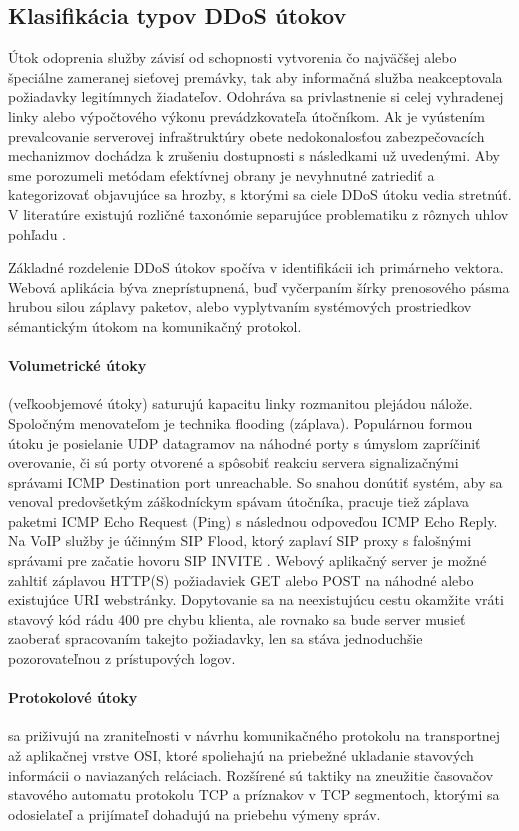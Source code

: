 \documentclass[12pt, a4paper]{article}
\begin{document}
\subsection{Klasifikácia typov DDoS útokov}
Útok odoprenia služby závisí od schopnosti vytvorenia čo najväčšej alebo špeciálne zameranej sieťovej 
premávky, tak aby informačná služba neakceptovala požiadavky legitímnych žiadateľov. Odohráva sa
privlastnenie si celej vyhradenej linky alebo výpočtového výkonu prevádzkovateľa útočníkom. 
Ak je vyústením prevalcovanie serverovej infraštruktúry obete nedokonalosťou zabezpečovacích 
mechanizmov dochádza k zrušeniu dostupnosti s následkami už uvedenými. Aby sme porozumeli metódam 
efektívnej obrany je nevyhnutné zatriediť a kategorizovať objavujúce sa
hrozby, s ktorými sa ciele DDoS útoku vedia stretnúť. V literatúre existujú rozličné taxonómie 
separujúce problematiku z rôznych uhlov pohľadu \cite{ddos-attacks} \cite{botnets} \cite{ddos-anatomy-2004} 
\cite{csirt-ddos}.

Základné rozdelenie DDoS útokov spočíva v identifikácii ich primárneho vektora. Webová aplikácia
býva zneprístupnená, buď vyčerpaním šírky prenosového pásma hrubou silou záplavy paketov, alebo
vyplytvaním systémových prostriedkov sémantickým útokom na komunikačný protokol.

\paragraph{Volumetrické útoky} (veľkoobjemové útoky) saturujú kapacitu linky rozmanitou plejádou nálože. 
Spoločným menovateľom je technika flooding (záplava). Populárnou formou útoku je posielanie UDP datagramov 
na náhodné porty s úmyslom zapríčiniť overovanie, či sú porty otvorené a spôsobiť reakciu 
servera signalizačnými správami ICMP Destination port unreachable. So snahou donútiť systém, aby sa venoval 
predovšetkým záškodníckym spávam útočníka, pracuje tiež záplava paketmi ICMP Echo Request (Ping) 
s následnou odpoveďou ICMP Echo Reply. Na VoIP služby je účinným SIP Flood, ktorý zaplaví SIP proxy s
falošnými správami pre začatie hovoru SIP INVITE \cite{botnets}. Webový aplikačný server je možné zahltiť 
záplavou HTTP(S) požiadaviek GET alebo POST na náhodné alebo existujúce URI webstránky. Dopytovanie sa na 
neexistujúcu cestu okamžite vráti stavový kód rádu 400 pre  chybu klienta, ale rovnako sa bude server 
musieť zaoberať spracovaním takejto požiadavky, len sa stáva jednoduchšie pozorovateľnou z prístupových 
logov. 

\paragraph{Protokolové útoky} sa priživujú na zraniteľnosti v návrhu komunikačného protokolu na transportnej
až aplikačnej vrstve OSI, ktoré spoliehajú na priebežné ukladanie stavových informácii o naviazaných
reláciach. Rozšírené sú taktiky na zneužitie časovačov stavového automatu protokolu TCP a príznakov v TCP 
segmentoch, ktorými sa odosielateľ a prijímateľ dohadujú na priebehu výmeny správ. 
\end{document}
